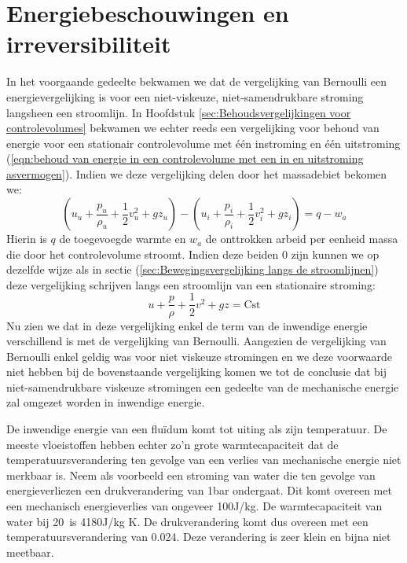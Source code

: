 	\section{Energiebeschouwingen en irreversibiliteit}
	\label{sec:Energiebeschouwingen en irreversibiliteit}
In het voorgaande gedeelte bekwamen we dat de vergelijking van Bernoulli een energievergelijking is voor een niet-viskeuze, niet-samendrukbare stroming langsheen een stroomlijn. In Hoofdstuk \ref{sec:Behoudsvergelijkingen voor controlevolumes} bekwamen we echter reeds een vergelijking voor behoud van energie voor een stationair controlevolume met één instroming en één uitstroming (\ref{eqn:behoud van energie in een controlevolume met een in en uitstroming asvermogen}). Indien we deze vergelijking delen door het massadebiet bekomen we:
\begin{equation}
	(u_u + \frac{p_u}{\rho_u} + \frac{1}{2}v^2_u + g z_u) - (u_i + \frac{p_i}{\rho_i}+ \frac{1}{2}v^2_i + g z_i) = q-w_a
\end{equation}
Hierin is $q$ de toegevoegde warmte en $w_a$ de onttrokken arbeid per eenheid massa die door het controlevolume stroomt. Indien deze beiden $0$ zijn kunnen we op dezelfde wijze als in sectie (\ref{sec:Bewegingsvergelijking langs de stroomlijnen}) deze vergelijking schrijven langs een stroomlijn van een stationaire stroming:
\begin{equation}
	u + \frac{p}{\rho} + \frac{1}{2}v^2 + g z = \text{Cst}
	\label{eqn:behoud van energie lang een stroomlijn}
\end{equation}
Nu zien we dat in deze vergelijking enkel de term van de inwendige energie verschillend is met de vergelijking van Bernoulli. Aangezien de vergelijking van Bernoulli enkel geldig was voor niet viskeuze stromingen en we deze voorwaarde niet hebben bij de bovenstaande vergelijking komen we tot de conclusie dat bij niet-samendrukbare viskeuze stromingen een gedeelte van de mechanische energie zal omgezet worden in inwendige energie.

De inwendige energie van een fluïdum komt tot uiting als zijn temperatuur. De meeste vloeistoffen hebben echter zo'n grote warmtecapaciteit dat de temperatuursverandering ten gevolge van een verlies van mechanische energie niet merkbaar is. Neem als voorbeeld een stroming van water die ten gevolge van energieverliezen een drukverandering van \unit{1}{bar} ondergaat. Dit komt overeen met een mechanisch energieverlies van ongeveer \unit{100}{J/kg}. De warmtecapaciteit van water bij 20\degC\ is \unit{4180}{J/kg K}. De drukverandering komt dus overeen met een temperatuursverandering van 0.024\degC. Deze verandering is zeer klein en bijna niet meetbaar.

